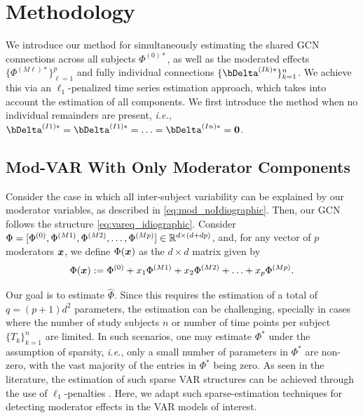 \section{Methodology}\label{section:method}

We introduce our method for simultaneously estimating the shared GCN connections across all subjects $\Phi^{(0)*}$, as well as the moderated effects $\{\Phi^{(M\ell)*}\}_{\ell = 1}^p$ and fully individual connections $\{\bDelta^{(Ik)*}\}_{k=1}^n$. We achieve this via an $\ell_1$-penalized time series estimation approach, which takes into account the estimation of all components. We first introduce the method when no individual remainders are present, \textit{i.e.,} $\bDelta^{(I1)*} = \bDelta^{(I1)*} = \ldots = \bDelta^{(In)*} = \bzero $. 

\subsection{Mod-VAR With Only Moderator Components}\label{subsec:modvar_moderator}

Consider the case in which all inter-subject variability can be explained by our moderator variables, as described in \eqref{eq:mod_noIdiographic}. Then, our GCN follows the structure \eqref{eq:vareq_idiographic}. Consider $\Phi = [\Phi^{(0)} , \Phi^{(M1)} , \Phi^{(M2)} ,\ldots , \Phi^{(Mp)}]\in\mathbb{R}^{d\times (d+dp)}$, and, for any vector of $p$ moderators $\bm{x}$, we define $\Phi(\bm{x})$ as the $d\times d$ matrix given by
\begin{equation}\label{eq:mod_est_noIdiographic}
    \Phi(\bm{x}) := \Phi^{(0)}  + x_1 \Phi^{(M1)} + x_2 \Phi^{(M2)} + \ldots + x_p \Phi^{(Mp)}. 
\end{equation}

Our goal is to estimate $\hat\Phi$. Since this requires the estimation of a total of $q = (p + 1) d^2$ parameters, the estimation can be challenging, specially in cases where the number of study subjects $n$ or number of time points per subject $\{T_k\}_{k=1}^n$ are limited. In such scenarios, one may estimate $\Phi^{*}$ under the assumption of sparsity, \textit{i.e.}, only a small number of parameters in $\Phi^{*} $ are non-zero, with the vast majority of the entries in $\Phi^*$ being zero. As seen in the literature, the estimation of such sparse VAR structures can be achieved through the use of $\ell_1$-penalties \cite{basu2015regularized,fisher2022penalized}. Here, we adapt such sparse-estimation techniques for detecting moderator effects in the VAR models of interest.


